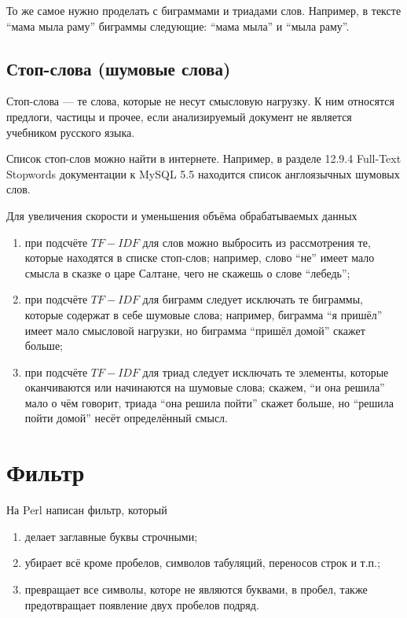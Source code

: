 То же самое нужно проделать с биграммами и триадами слов.
Например, в тексте ``мама мыла раму'' биграммы следующие:
``мама мыла'' и ``мыла раму''.

\subsection{Стоп-слова (шумовые слова)}
Стоп-слова --- те слова, которые не несут смысловую нагрузку.
К ним относятся предлоги, частицы и прочее,
если анализируемый документ не является учебником русского языка.

Список стоп-слов можно найти в интернете.
Например, в разделе 12.9.4 Full-Text Stopwords документации к MySQL 5.5
\cite{Oracle} находится список англоязычных шумовых слов.

Для увеличения скорости и уменьшения объёма обрабатываемых данных
\begin{enumerate}
  \item
    при подсчёте $TF-IDF$ для слов можно выбросить из рассмотрения те,
    которые находятся в списке стоп-слов;
    например, слово ``не'' имеет мало смысла в сказке о царе Салтане,
    чего не скажешь о слове ``лебедь'';
  \item
    при подсчёте $TF-IDF$ для биграмм следует исключать те биграммы,
    которые содержат в себе шумовые слова;
    например, биграмма ``я пришёл'' имеет мало смысловой нагрузки,
    но биграмма ``пришёл домой'' скажет больше;
  \item
    при подсчёте $TF-IDF$ для триад следует исключать те элементы,
    которые оканчиваются или начинаются на шумовые слова;
    скажем, ``и она решила'' мало о чём говорит,
    триада ``она решила пойти'' скажет больше,
    но ``решила пойти домой'' несёт определённый смысл.
\end{enumerate}

\section{Фильтр}
На Perl написан фильтр, который
\begin{enumerate}
  \item делает заглавные буквы строчными;
  \item убирает всё кроме пробелов, символов табуляций, переносов строк и т.п.;
  \item превращает все символы, которе не являются буквами, в пробел, также
    предотвращает появление двух пробелов подряд.
\end{enumerate}

